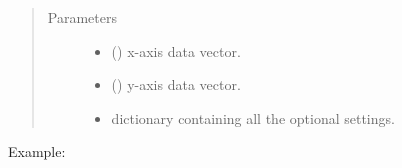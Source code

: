 \documentclass[letterpaper,10pt,english]{sphinxmanual}
\begin{document}
\begin{fulllineitems}
\begin{description}
\begin{quote}
\begin{description}
\end{description}\end{quote}

\end{description}
\begin{quote}\begin{description}
\item[{Parameters}] \leavevmode\begin{itemize}
\item {} 
 () \textendash{} x-axis data vector.

\item {} 
 () \textendash{} y-axis data vector.

\item {} 
 \textendash{} dictionary containing all the optional settings.

\end{itemize}

\end{description}\end{quote}

Example:

%
\begin{sphinxVerbatim}[commandchars=\\\{\}]
   
   

  
  

  
     
     
\end{sphinxVerbatim}

\end{fulllineitems}
\end{document}

